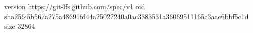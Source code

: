 version https://git-lfs.github.com/spec/v1
oid sha256:5b567a275a48691fd44a25022240a0ac3383531a36069511165c3aac6bbf5c1d
size 32864
